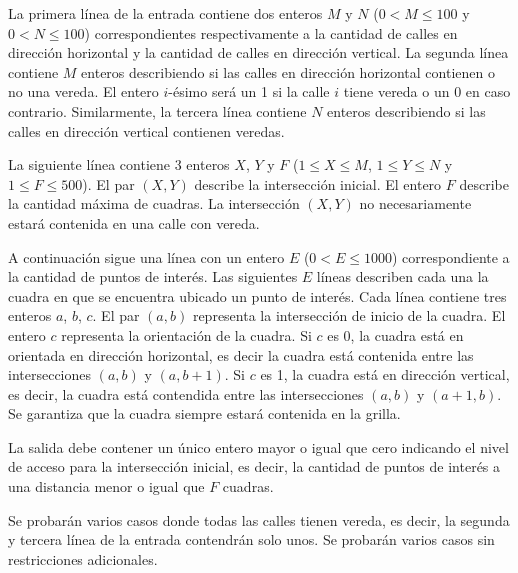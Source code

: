 \documentclass{oci}
\begin{document}
\begin{inputDescription}
  La primera línea de la entrada contiene dos enteros $M$ y $N$ ($0 < M \leq 100$ y $0 < N\leq 100$)
  correspondientes respectivamente a la cantidad de calles en dirección horizontal y la cantidad de
  calles en dirección vertical.
  La segunda línea contiene $M$ enteros describiendo si las calles en dirección horizontal
  contienen o no una vereda.
  El entero $i$-ésimo será un 1 si la calle $i$ tiene vereda o un 0 en caso contrario.
  Similarmente, la tercera línea contiene $N$ enteros describiendo si las calles en dirección
  vertical contienen veredas.

  La siguiente línea contiene 3 enteros $X$, $Y$ y $F$ ($1 \leq X \leq M$, $1 \leq Y \leq N$ y $1\leq F \leq 500$).
  El par $(X, Y)$ describe la intersección inicial.
  El entero $F$ describe la cantidad máxima de cuadras.
  La intersección $(X, Y)$ no necesariamente estará contenida en una calle con vereda.

  A continuación sigue una línea con un entero $E$ ($0 < E \leq 1000$) correspondiente a la cantidad
  de puntos de interés.
  Las siguientes $E$ líneas describen cada una la cuadra en que se encuentra ubicado un punto de interés.
  Cada línea contiene tres enteros $a$, $b$, $c$.
  El par $(a, b)$ representa la intersección de inicio de la cuadra.
  El entero $c$ representa la orientación de la cuadra.
  Si $c$ es 0, la cuadra está en orientada en dirección horizontal, es decir la cuadra está contenida entre las
  intersecciones $(a, b)$ y $(a, b + 1)$.
  Si $c$ es 1, la cuadra está en dirección vertical, es decir, la cuadra está contendida entre
  las intersecciones $(a, b)$ y $(a + 1, b)$.
  Se garantiza que la cuadra siempre estará contenida en la grilla.
\end{inputDescription}

\begin{outputDescription}
  La salida debe contener un único entero mayor o igual que cero indicando el nivel de acceso para
  la intersección inicial, es decir, la cantidad de puntos de interés a una distancia menor o igual
  que $F$ cuadras.
\end{outputDescription}

\begin{scoreDescription}
  Se probarán varios casos donde todas las calles tienen vereda, es decir, la segunda y tercera
  línea de la entrada contendrán solo unos.
  Se probarán varios casos sin restricciones adicionales.
\end{scoreDescription}

\begin{sampleDescription}
\end{sampleDescription}
\end{document}

